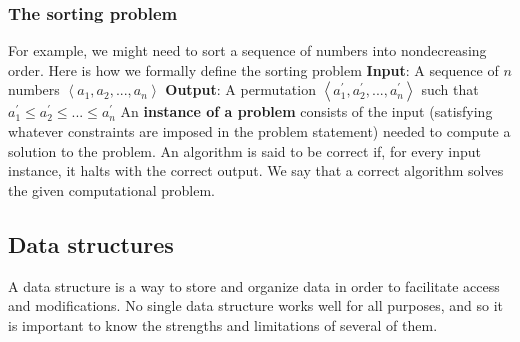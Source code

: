 \documentclass{report}
\begin{document}
    \subsubsection{The sorting problem}
    \bigbreak \noindent 
    For example, we might need to sort a sequence of numbers into nondecreasing order.  Here is how we formally define the sorting problem
    \bigbreak \noindent 
    \textbf{Input}: A sequence of $n$ numbers $\left\langle a_{1}, a_{2},...,a_{n} \right\rangle $
    \bigbreak \noindent 
    \textbf{Output}: A permutation $\left\langle a_{1}^{\prime}, a_{2}^{\prime},...,a_{n}^{\prime} \right\rangle $ such that $a_{1}^{\prime} \leq a_{2}^{\prime} \leq ... \leq a_{n}^{\prime}$
    \bigbreak \noindent 
    An \textbf{instance of a problem} consists of the input (satisfying whatever constraints are imposed in the problem statement) needed to compute a solution to the problem.
    \bigbreak \noindent 
    An algorithm is said to be correct if, for every input instance, it halts with the correct output. We say that a correct algorithm solves the given computational problem.
    \bigbreak \noindent 
    \subsection{Data structures}
    \bigbreak \noindent 
    A data structure is a way to store and organize data in order to facilitate access and modifications. No single data structure works well for all purposes, and so it is important to know the strengths and limitations of several of them.

    \pagebreak 
    \bigbreak \noindent 
\end{document}
